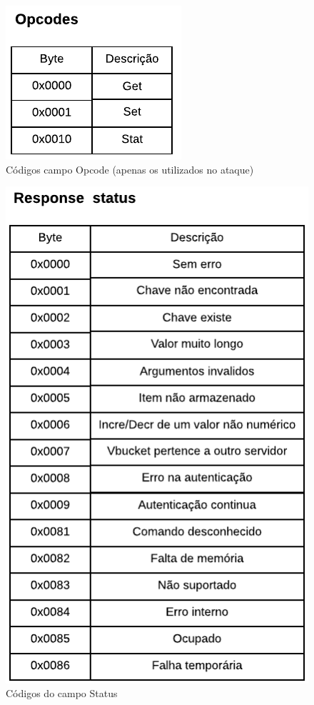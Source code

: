 \begin{figure}[H]
     \centering
     \includegraphics[scale=1]{img/Opcode_Memcached.pdf}
     \caption{Códigos campo Opcode (apenas os utilizados no ataque) }
     \label{img:Opcode}
\end{figure}

\begin{figure}[H]
     \centering
     \includegraphics[scale=1]{img/Response_Status.pdf}
     \caption{Códigos do campo Status }
     \label{img:Status_Code}
\end{figure}

